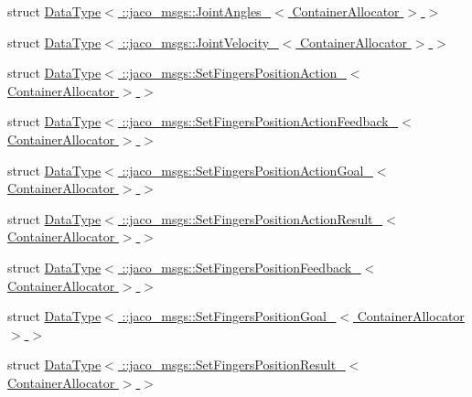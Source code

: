 \begin{DoxyCompactItemize}
\item 
struct \hyperlink{structros_1_1message__traits_1_1DataType_3_01_1_1jaco__msgs_1_1JointAngles___3_01ContainerAllocator_01_4_01_4}{Data\+Type$<$ \+::jaco\+\_\+msgs\+::\+Joint\+Angles\+\_\+$<$ Container\+Allocator $>$ $>$}
\item 
struct \hyperlink{structros_1_1message__traits_1_1DataType_3_01_1_1jaco__msgs_1_1JointVelocity___3_01ContainerAllocator_01_4_01_4}{Data\+Type$<$ \+::jaco\+\_\+msgs\+::\+Joint\+Velocity\+\_\+$<$ Container\+Allocator $>$ $>$}
\item 
struct \hyperlink{structros_1_1message__traits_1_1DataType_3_01_1_1jaco__msgs_1_1SetFingersPositionAction___3_01ContainerAllocator_01_4_01_4}{Data\+Type$<$ \+::jaco\+\_\+msgs\+::\+Set\+Fingers\+Position\+Action\+\_\+$<$ Container\+Allocator $>$ $>$}
\item 
struct \hyperlink{structros_1_1message__traits_1_1DataType_3_01_1_1jaco__msgs_1_1SetFingersPositionActionFeedback_40205cb43a645286155b7b77868c5754}{Data\+Type$<$ \+::jaco\+\_\+msgs\+::\+Set\+Fingers\+Position\+Action\+Feedback\+\_\+$<$ Container\+Allocator $>$ $>$}
\item 
struct \hyperlink{structros_1_1message__traits_1_1DataType_3_01_1_1jaco__msgs_1_1SetFingersPositionActionGoal___3_01ContainerAllocator_01_4_01_4}{Data\+Type$<$ \+::jaco\+\_\+msgs\+::\+Set\+Fingers\+Position\+Action\+Goal\+\_\+$<$ Container\+Allocator $>$ $>$}
\item 
struct \hyperlink{structros_1_1message__traits_1_1DataType_3_01_1_1jaco__msgs_1_1SetFingersPositionActionResult___261d7fa0605a3d790ae7a5ae14788b18}{Data\+Type$<$ \+::jaco\+\_\+msgs\+::\+Set\+Fingers\+Position\+Action\+Result\+\_\+$<$ Container\+Allocator $>$ $>$}
\item 
struct \hyperlink{structros_1_1message__traits_1_1DataType_3_01_1_1jaco__msgs_1_1SetFingersPositionFeedback___3_01ContainerAllocator_01_4_01_4}{Data\+Type$<$ \+::jaco\+\_\+msgs\+::\+Set\+Fingers\+Position\+Feedback\+\_\+$<$ Container\+Allocator $>$ $>$}
\item 
struct \hyperlink{structros_1_1message__traits_1_1DataType_3_01_1_1jaco__msgs_1_1SetFingersPositionGoal___3_01ContainerAllocator_01_4_01_4}{Data\+Type$<$ \+::jaco\+\_\+msgs\+::\+Set\+Fingers\+Position\+Goal\+\_\+$<$ Container\+Allocator $>$ $>$}
\item 
struct \hyperlink{structros_1_1message__traits_1_1DataType_3_01_1_1jaco__msgs_1_1SetFingersPositionResult___3_01ContainerAllocator_01_4_01_4}{Data\+Type$<$ \+::jaco\+\_\+msgs\+::\+Set\+Fingers\+Position\+Result\+\_\+$<$ Container\+Allocator $>$ $>$}

\end{DoxyCompactItemize}
